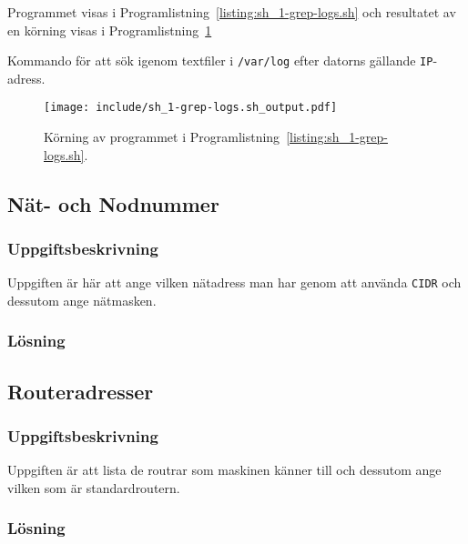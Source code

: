 Programmet visas i Programlistning~\ref{listing:sh_1-grep-logs.sh} och
resultatet av en körning visas i
Programlistning~\ref{listing:sh_1-grep-logs.sh_output}

\begin{listing}[H]
  \caption{Kommando för att sök igenom textfiler i \texttt{/var/log} efter
           datorns gällande \texttt{IP}-adress.}
  \label{listing:sh_1-grep-logs.sh}
\end{listing}

\begin{figure}[htp]
  \centering 
  \texttt{[image: include/sh\_1-grep-logs.sh\_output.pdf]}
  \caption{Körning av programmet i Programlistning~\ref{listing:sh_1-grep-logs.sh}.}
  \label{listing:sh_1-grep-logs.sh_output}
\end{figure}


\subsection{Nät- och Nodnummer}
\subsubsection{Uppgiftsbeskrivning}
Uppgiften är här att ange vilken nätadress man har genom att använda
\texttt{CIDR} och dessutom ange nätmasken.


\subsubsection{Lösning}


\subsection{Routeradresser}
\subsubsection{Uppgiftsbeskrivning}
Uppgiften är att lista de routrar som maskinen känner till och dessutom ange
vilken som är standardroutern.

\subsubsection{Lösning}


